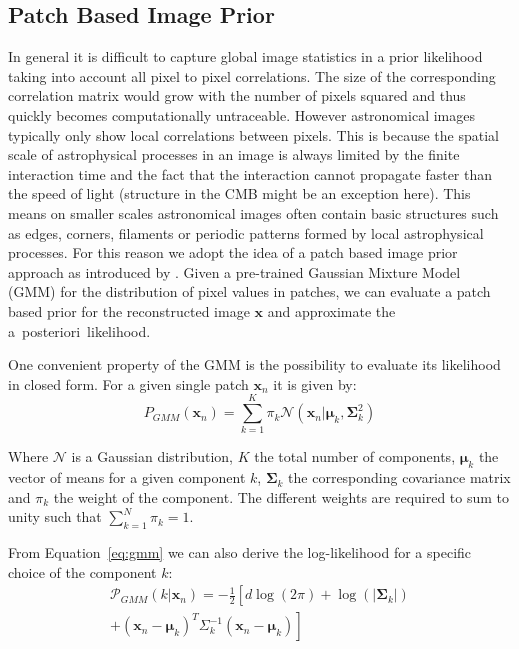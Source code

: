 \documentclass[twocolumn]{aastex631}
\newcommand{\aposteriori}{a~posteriori~}
\begin{document}
    \subsection{Patch Based Image Prior}
    In general it is difficult to capture global image statistics in a prior likelihood taking into account all pixel to pixel correlations. The size of the corresponding correlation matrix would grow with the number of pixels squared and thus quickly becomes computationally untraceable. However astronomical images typically only show local correlations between pixels. This is because the spatial scale of astrophysical processes in an image is always limited by the finite interaction time and the fact that the interaction cannot propagate faster than the speed of light (structure in the CMB might be an exception here). This means on smaller scales astronomical images often contain basic structures such as edges, corners, filaments or periodic patterns formed by local astrophysical processes. For this reason we adopt the idea of a patch based image prior approach as introduced by \cite{Zoran2011}. Given a pre-trained Gaussian Mixture Model (GMM) for the distribution of pixel values in patches, we can evaluate a patch based prior for the reconstructed image $\mathbf{x}$ and approximate the \aposteriori likelihood.
    
    One convenient property of the GMM is the possibility to evaluate its likelihood in closed form. For a given single patch $\mathbf{x}_n$ it is given by:
    \begin{equation}
        \label{eq:gmm}
        P_{GMM}(\mathbf{x}_n) = \sum_{k=1}^K \pi_k \mathcal{N}(\mathbf{x}_n| \boldsymbol{\mu}_k, \boldsymbol{\Sigma}_k^2)
    \end{equation}

    Where $\mathcal{N}$ is a Gaussian distribution, $K$ the total number of components, $\boldsymbol{\mu}_k$ the vector of means for a given component $k$, $\boldsymbol{\Sigma}_k$ the corresponding covariance matrix and $\pi_k$ the weight of the component. The different weights are required to sum to unity such that $\sum_{k=1}^N\pi_k = 1$. 

    From Equation~\ref{eq:gmm} we can also derive the log-likelihood for a specific choice of the component $k$:
    \begin{equation}
    \begin{split}
    \mathcal{P}_{GMM}(k| \mathbf{x}_n) = -\frac{1}{2} \left[ \right. d \log(2\pi)
    + \log(|\boldsymbol \Sigma_{k}|)\\
    + (\mathbf{x}_n - \boldsymbol{\mu}_{k})^T \Sigma^{-1}_{k}(\mathbf{x}_n - \boldsymbol{\mu}_{k}) \left. \right]
    \end{split}
    \end{equation}
\end{document}
